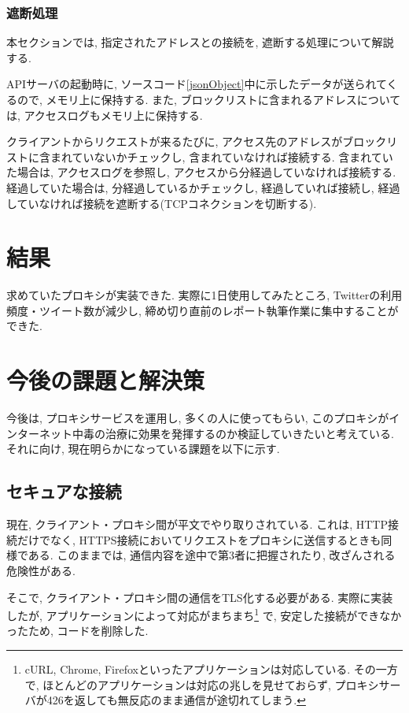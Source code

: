 \documentclass[10pt,a4paper,uplatex,a4j,dvipdfmx]{jsarticle}
\begin{document}
\begin{multicols}{2}
    \subsubsection{遮断処理}
    本セクションでは, 指定されたアドレスとの接続を, 遮断する処理について解説する.
    
    APIサーバの起動時に, ソースコード\ref{jsonObject}中に示したデータが送られてくるので, メモリ上に保持する. また, ブロックリストに含まれるアドレスについては, アクセスログもメモリ上に保持する.

    クライアントからリクエストが来るたびに, アクセス先のアドレスがブロックリストに含まれていないかチェックし, 含まれていなければ接続する.
    含まれていた場合は, アクセスログを参照し, アクセスから分経過していなければ接続する. 経過していた場合は, 分経過しているかチェックし, 経過していれば接続し, 経過していなければ接続を遮断する(TCPコネクションを切断する).

    \section{結果}
    求めていたプロキシが実装できた.
    実際に1日使用してみたところ, Twitterの利用頻度・ツイート数が減少し, 締め切り直前のレポート執筆作業に集中することができた.
    
    \section{今後の課題と解決策}
    今後は, プロキシサービスを運用し, 多くの人に使ってもらい, このプロキシがインターネット中毒の治療に効果を発揮するのか検証していきたいと考えている.
    それに向け, 現在明らかになっている課題を以下に示す.
    
    \subsection{セキュアな接続}
    \label{sec:secure}
    現在, クライアント・プロキシ間が平文でやり取りされている.
    これは, HTTP接続だけでなく, HTTPS接続においてリクエストをプロキシに送信するときも同様である.
    このままでは, 通信内容を途中で第3者に把握されたり, 改ざんされる危険性がある.
    
    そこで, クライアント・プロキシ間の通信をTLS化する必要がある.
    実際に実装したが, アプリケーションによって対応がまちまち\footnote{cURL\cite{curlhttps}, Chrome\cite{chromehttps}, Firefox\cite{firefoxhttps}といったアプリケーションは対応している. その一方で, ほとんどのアプリケーションは対応の兆しを見せておらず, プロキシサーバが426を返しても無反応のまま通信が途切れてしまう.}
    で, 安定した接続ができなかったため, コードを削除した.
      

\end{multicols}
\end{document}
